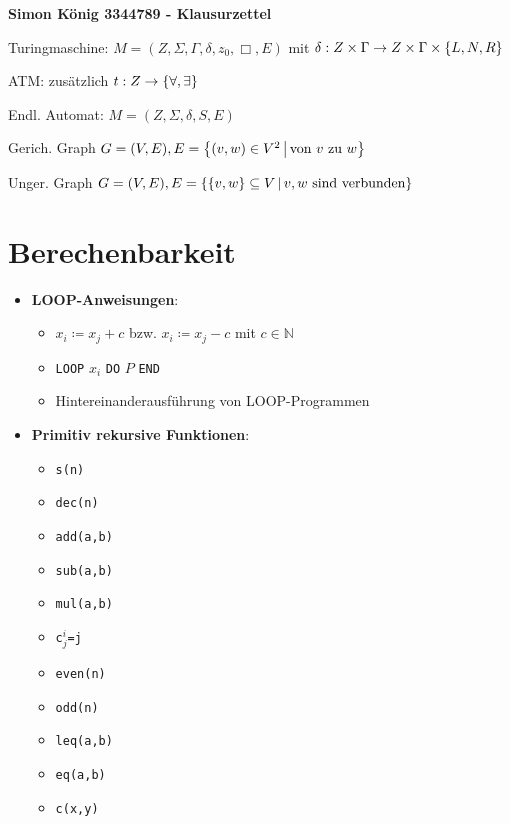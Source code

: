 \documentclass[landscape, 8pt, a4paper]{extarticle}
\newcommand{\N}{\mathbb{N}}
\newcommand{\set}[2]{\ensuremath\left\{ #1 \,\middle|\, #2 \right\}}
\newcommand{\simpleset}[1]{\ensuremath\left\{ #1 \right\}}
\begin{document}
\begin{multicols}{3}
	\textbf{Simon König 3344789 - Klausurzettel}

	Turingmaschine: $M=(Z,\Sigma,\Gamma,\delta,z_0,\Box,E)$ mit $\delta: Z\times\Gamma\rightarrow Z\times\Gamma\times\simpleset{L,N,R}$

	ATM: zusätzlich $t: Z\rightarrow \simpleset{\forall, \exists}$

	Endl. Automat: $M=(Z,\Sigma, \delta, S, E)$

	Gerich. Graph $G=(V,E), E= \set{(v,w)\in V^2}{\text{von $v$ zu $w$}}$

	Unger. Graph $G=(V,E), E= \set{\simpleset{v,w}\subseteq V}{\text{$v,w$ sind verbunden}}$

	\section{Berechenbarkeit}
	\begin{itemize}
		\item \textbf{LOOP-Anweisungen}:
		\begin{itemize}
			\item $x_i\coloneqq x_j+c$ bzw. $x_i\coloneqq x_j-c$ mit $c\in\N$
			\item \texttt{LOOP} $x_i$ \texttt{DO} $P$ \texttt{END}
			\item Hintereinanderausführung von LOOP-Programmen
		\end{itemize}

		\item \textbf{Primitiv rekursive Funktionen}:
		\begin{multicols}{2}
			\begin{itemize}
				\item \texttt{s(n)}
				\item \texttt{dec(n)}
				\item \texttt{add(a,b)}
				\item \texttt{sub(a,b)}
				\item \texttt{mul(a,b)}
				\item \texttt{c$^i_j$=j}
				\item \texttt{even(n)}
				\item \texttt{odd(n)}
				\item \texttt{leq(a,b)}
				\item \texttt{eq(a,b)}
				\item \texttt{c(x,y)}
			\end{itemize}
		\end{multicols}


\end{itemize}
\end{multicols}
\end{document}

